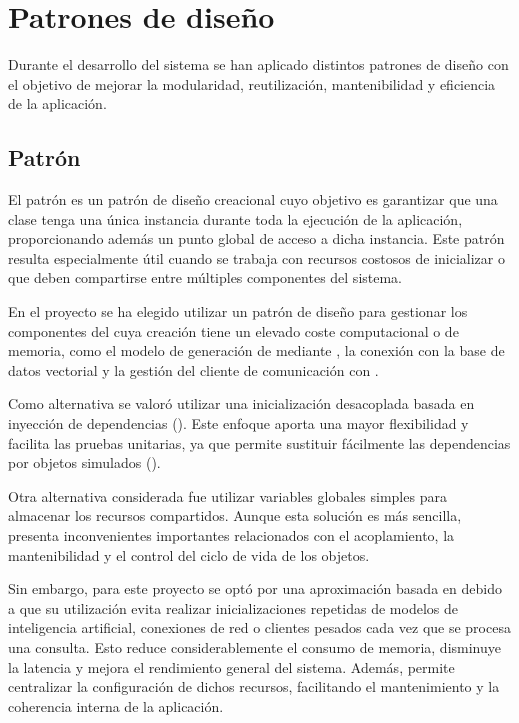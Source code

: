 \section{Patrones de diseño}

Durante el desarrollo del sistema se han aplicado distintos patrones de diseño  con el objetivo de mejorar la modularidad, reutilización, mantenibilidad y eficiencia de la aplicación.

\subsection{Patrón }

El patrón  es un patrón de diseño creacional cuyo objetivo es garantizar que una clase tenga una única instancia durante toda la ejecución de la aplicación, proporcionando además un punto global de acceso a dicha instancia. Este patrón resulta especialmente útil cuando se trabaja con recursos costosos de inicializar o que deben compartirse entre múltiples componentes del sistema.

En el proyecto se ha elegido utilizar un patrón de diseño  para gestionar los componentes del  cuya creación tiene un elevado coste computacional o de memoria, como el modelo de generación de  mediante , la conexión con la base de datos vectorial  y la gestión del cliente de comunicación con .

Como alternativa se valoró utilizar una inicialización desacoplada basada en inyección de dependencias (). Este enfoque aporta una mayor flexibilidad y facilita las pruebas unitarias, ya que permite sustituir fácilmente las dependencias por objetos simulados (). 

Otra alternativa considerada fue utilizar variables globales simples para almacenar los recursos compartidos. Aunque esta solución es más sencilla, presenta inconvenientes importantes relacionados con el acoplamiento, la mantenibilidad y el control del ciclo de vida de los objetos.

Sin embargo, para este proyecto se optó por una aproximación basada en  debido a que su utilización evita realizar inicializaciones repetidas de modelos de inteligencia artificial, conexiones de red o clientes pesados cada vez que se procesa una consulta. Esto reduce considerablemente el consumo de memoria, disminuye la latencia y mejora el rendimiento general del sistema. Además, permite centralizar la configuración de dichos recursos, facilitando el mantenimiento y la coherencia interna de la aplicación.

